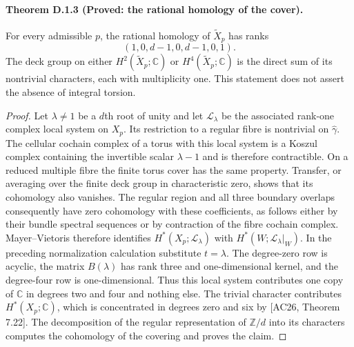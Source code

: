 \paragraph{Theorem D.1.3 (Proved: the rational homology of the cover).}
For every admissible $p$, the rational homology of $\widetilde X_p$ has
ranks
\[
 (1,0,d-1,0,d-1,0,1).
\]
The deck group on either $H^2(\widetilde X_p;\mathbb C)$ or
$H^4(\widetilde X_p;\mathbb C)$ is the direct sum of its nontrivial
characters, each with multiplicity one. This statement does not
assert the absence of integral torsion.
\begin{proof}
Let $\lambda\ne1$ be a $d$th root of unity and let
$\mathcal L_\lambda$ be the associated rank-one complex local system
on $X_p$. Its restriction to a regular fibre is nontrivial on
$\widehat\gamma$. The cellular cochain complex of a torus with this
local system is a Koszul complex containing the invertible scalar
$\lambda-1$ and is therefore contractible. On a reduced multiple
fibre the finite torus cover has the same property. Transfer, or
averaging over the finite deck group in characteristic zero, shows
that its cohomology also vanishes. The regular region and all three
boundary overlaps consequently have zero cohomology with these
coefficients, as follows either by their bundle spectral sequences
or by contraction of the fibre cochain complex. Mayer--Vietoris
therefore identifies $H^*(X_p;\mathcal L_\lambda)$ with
$H^*(W;\mathcal L_\lambda|_W)$.
In the preceding normalization calculation substitute $t=\lambda$.
The degree-zero row is acyclic, the matrix $B(\lambda)$ has rank three
and one-dimensional kernel, and the degree-four row is one-dimensional.
Thus this local system contributes one copy of $\mathbb C$ in degrees
two and four and nothing else. The trivial character contributes
$H^*(X_p;\mathbb C)$, which is concentrated in degrees zero and six by
\textup{[AC26, Theorem 7.22]}. The decomposition of the regular
representation of $\mathbb Z/d$ into its characters computes the
cohomology of the covering and proves the claim.
\end{proof}

